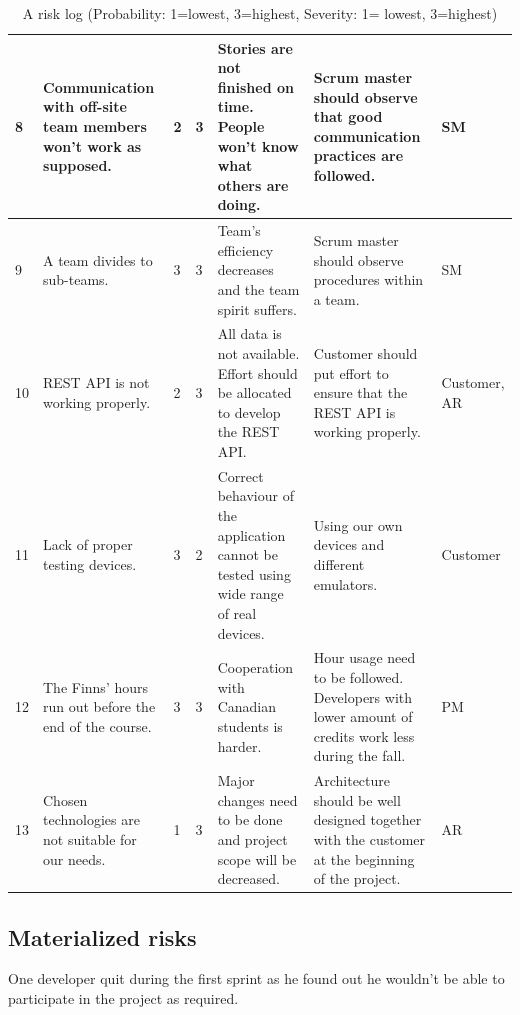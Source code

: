 \begin{table}[H]
{\begin{tabular}{|p{0.5cm}|p{3cm}|p{1cm}|p{1cm}|p{4cm}|p{4cm}|p{1.5cm}|}
8 &
Communication with off-site team members won't work as supposed. &
2 &
3 &
Stories are not finished on time. People won't know what others are doing. &
Scrum master should observe that good communication practices are followed. &
SM \\
\hline

9 &
A team divides to sub-teams. &
3 &
3 &
Team's efficiency decreases and the team spirit suffers. &
Scrum master should observe procedures within a team. &
SM \\
\hline

10 &
REST API is not working properly. &
2 &
3 &
All data is not available. Effort should be allocated to develop the REST API. &
Customer should put effort to ensure that the REST API is working properly.
& Customer, AR \\
\hline

11 &
Lack of proper testing devices. &
3 &
2 &
Correct behaviour of the application cannot be tested using wide range of real
devices.
& Using our own devices and different emulators. & 
Customer \\
\hline

12 &
The Finns' hours run out before the end of the course. &
3 &
3 &
Cooperation with Canadian students is harder. &
Hour usage need to be followed. Developers with lower amount of credits
work less during the fall. &
PM \\
\hline

13 &
Chosen technologies are not suitable for our needs. & 
1 &
3 &
Major changes need to be done and project scope will be decreased. &
Architecture should be well designed together with the customer at the
beginning of the project. &
AR \\
\hline


\end{tabular} 
}
\caption{A risk log (Probability: 1=lowest, 3=highest, Severity: 1= lowest, 
3=highest)}
\label{table:Risklog}
\end{table}

\subsection{Materialized risks}

One developer quit during the first sprint as he found out he wouldn't be able
to participate in the project as required.

